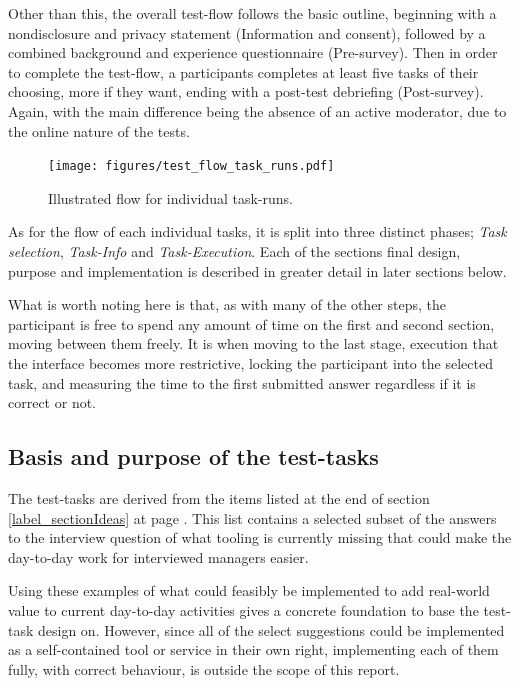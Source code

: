 {  Other than this, the overall test-flow follows the basic outline, beginning
  with a nondisclosure and privacy statement (Information and consent),
  followed by a combined background and experience questionnaire (Pre-survey).
  Then in order to complete the test-flow, a participants completes at least
  five tasks of their choosing, more if they want, ending with a post-test
  debriefing (Post-survey). Again, with the main difference being the absence
  of an active moderator, due to the online nature of the tests.

  \begin{figure}[h!]
    \centering
    \texttt{[image: figures/test\_flow\_task\_runs.pdf]}
    \caption{Illustrated flow for individual task-runs.}
  \end{figure}

  As for the flow of each individual tasks, it is split into three distinct phases;
  \textit{Task selection},
  \textit{Task-Info} and
  \textit{Task-Execution}.
  Each of the sections final design, purpose and implementation is
  described in greater detail in later sections below.

  What is worth noting here is that, as with many of the other steps, the
  participant is free to spend any amount of time on the first and second
  section, moving between them freely. It is when moving to the last stage,
  execution that the interface becomes more restrictive, locking the
  participant into the selected task, and measuring the time to the first
  submitted answer regardless if it is correct or not.

	\subsection{Basis and purpose of the test-tasks}\label{label_basis_purpose}

  The test-tasks are derived from the items listed at the
  end of section \ref{label_sectionIdeas} at page \pageref{label_ideas}.
  This list contains a selected subset of the answers to the
  interview question of what tooling is currently missing that could make
  the day-to-day work for interviewed managers easier.

  Using these examples of what could feasibly be implemented to add
  real-world value to current day-to-day activities gives a concrete
  foundation to base the test-task design on. However, since all of
  the select suggestions could be implemented as a self-contained tool or
  service in their own right, implementing each of them fully, with
  correct behaviour, is outside the scope of this report.

}
